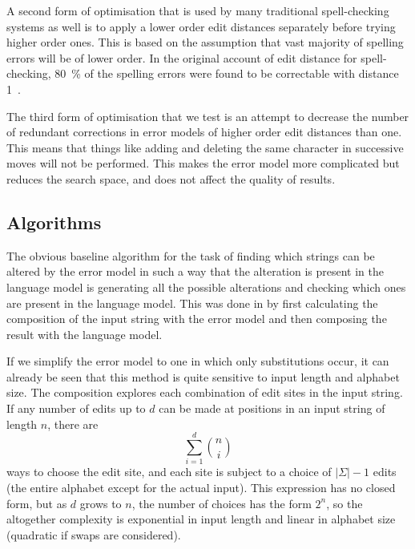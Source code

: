 \documentclass[11pt]{article}
\begin{document}
A second form of optimisation that is used by many traditional spell-checking
systems as well is to apply a lower order edit distances separately before
trying higher order ones. This is based on the assumption that vast majority
of spelling errors will be of lower order. In the original
account of edit distance for spell-checking, 80~\% of the spelling
errors were found to be correctable with distance 1~\cite{Pollock/1984}.

The third form of optimisation that we test is an attempt to decrease the
number of redundant corrections in error models of higher order edit distances
than one. This means that things like  adding and deleting the
same character in successive moves will not be performed. This makes the error
model more complicated but reduces the search space, and does not affect the
quality of results.

\subsection{Algorithms}
\label{sec:algorithms}
The obvious baseline algorithm for the task of finding which strings can be
altered by the error model in such a way that the alteration is present in the
language model is generating all the possible alterations and checking which
ones are present in the language model. This was done in 
by first calculating the composition of the input string with the error
model and then composing the result with the language model.

If we simplify the error model to one in which only substitutions occur, it can
already be seen that this method is quite sensitive to input length and
alphabet size. The composition explores each combination of edit sites in the
input string. If any number of edits up to $d$ can be made at positions in an
input string of length $n$, there are
\begin{displaymath}
\sum_{i=1}^{d} {n \choose i}
\end{displaymath}
ways to choose the edit site, and each site is subject to a choice of
$|\Sigma| - 1$ edits (the
entire alphabet except for the actual input). This expression has no closed
form, but as $d$ grows to $n$, the number of choices has the form $2^n$,
so the altogether complexity is exponential in input length and linear
in alphabet size (quadratic if swaps are considered).
\end{document}

